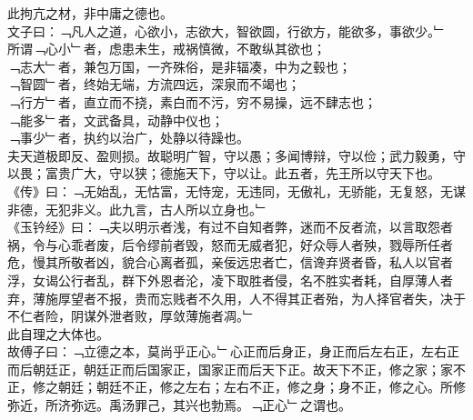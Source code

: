 此拘亢之材，非中庸之德也。\\
文子曰：﹁凡人之道，心欲小，志欲大，智欲圆，行欲方，能欲多，事欲少。﹂\\
所谓﹁心小﹂者，虑患未生，戒祸慎微，不敢纵其欲也；\\
﹁志大﹂者，兼包万国，一齐殊俗，是非辐凑，中为之毂也；\\
﹁智圆﹂者，终始无端，方流四远，深泉而不竭也；\\
﹁行方﹂者，直立而不挠，素白而不污，穷不易操，远不肆志也；\\
﹁能多﹂者，文武备具，动静中仪也；\\
﹁事少﹂者，执约以治广，处静以待躁也。\\
夫天道极即反、盈则损。故聪明广智，守以愚；多闻博辩，守以俭；武力毅勇，守以畏；富贵广大，守以狭；德施天下，守以让。此五者，先王所以守天下也。\\
《传》曰：﹁无始乱，无怙富，无恃宠，无违同，无傲礼，无骄能，无复怒，无谋非德，无犯非义。此九言，古人所以立身也。﹂\\
《玉钤经》曰：﹁夫以明示者浅，有过不自知者弊，迷而不反者流，以言取怨者祸，令与心乖者废，后令缪前者毁，怒而无威者犯，好众辱人者殃，戮辱所任者危，慢其所敬者凶，貌合心离者孤，亲佞远忠者亡，信谗弃贤者昏，私人以官者浮，女谒公行者乱，群下外恩者沦，凌下取胜者侵，名不胜实者耗，自厚薄人者弃，薄施厚望者不报，贵而忘贱者不久用，人不得其正者殆，为人择官者失，决于不仁者险，阴谋外泄者败，厚敛薄施者凋。﹂\\
此自理之大体也。
\\
故傅子曰：﹁立德之本，莫尚乎正心。﹂心正而后身正，身正而后左右正，左右正而后朝廷正，朝廷正而后国家正，国家正而后天下正。故天下不正，修之家；家不正，修之朝廷；朝廷不正，修之左右；左右不正，修之身；身不正，修之心。所修弥近，所济弥远。禹汤罪己，其兴也勃焉。﹁正心﹂之谓也。
\\%
%
